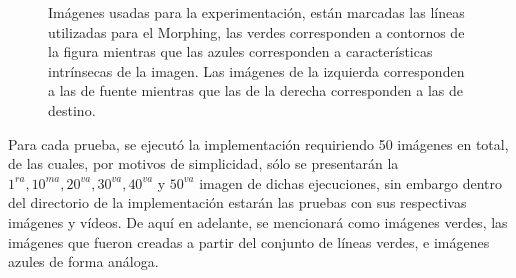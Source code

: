 \documentclass[conference]{IEEEtran}
\begin{document}
\begin{figure}[H]
\begin{multicols}{2}
\end{multicols}
\caption{Imágenes usadas para la experimentación, están marcadas las líneas utilizadas para el Morphing, las verdes corresponden a contornos de la figura mientras que las azules corresponden a características intrínsecas de la imagen. Las imágenes de la izquierda corresponden a las de fuente mientras que las de la derecha corresponden a las de destino.}
\end{figure}
	
	Para cada prueba, se ejecutó la implementación requiriendo 50 imágenes en total, de las cuales, por motivos de simplicidad, sólo se presentarán la $1^{ra}, 10^{ma}, 20^{va}, 30^{va}, 40^{va}$ y $50^{va}$ imagen de dichas ejecuciones, sin embargo dentro del directorio de la implementación estarán las pruebas con sus respectivas imágenes y vídeos.
	De aquí en adelante, se mencionará como imágenes verdes, las imágenes que fueron creadas a partir del conjunto de líneas verdes, e imágenes azules de forma análoga. 
	
\end{document}
